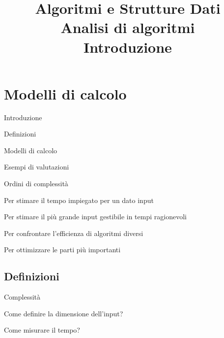 
\usepackage{epigraph}

\title[ASD - Analisi di algoritmi]{\textbf{Algoritmi e Strutture Dati}\\[12pt]Analisi di algoritmi\\Introduzione}

\graphicspath{{figs/02/}}




\FrameTitle{}

\FrameContent

\section{Modelli di calcolo}

\begin{frame}{Introduzione}

\vspace{-9pt}
\begin{myboxtitle}
\BIL
\item Definizioni
\item Modelli di calcolo
\item Esempi di valutazioni
\item Ordini di complessità
\EIL
\end{myboxtitle}

\begin{myboxtitle}[Perché?]
\BI
\item Per stimare il tempo impiegato per un dato input
\item Per stimare il più grande input gestibile in tempi ragionevoli
\item Per confrontare l'efficienza di algoritmi diversi
\item Per ottimizzare le parti più importanti
\EI
\end{myboxtitle}
\end{frame}



\subsection{Definizioni}

\begin{frame}{Complessità}

\vspace{-9pt}
\begin{myboxtitle}
\BI
\item Come definire la dimensione dell'input?
\item Come misurare il tempo?
\EI
\end{myboxtitle}

\end{frame}



